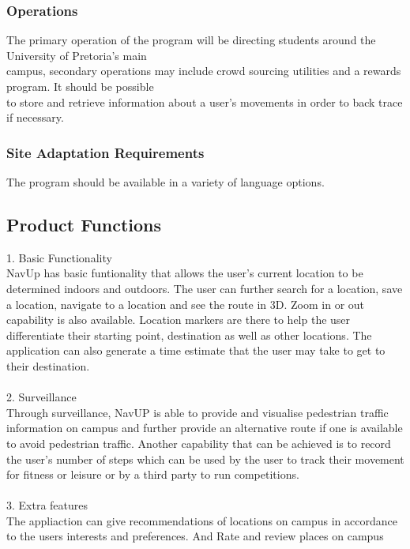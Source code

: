 \documentclass[a4paper,10pt]{article}
\begin{document}
		\subsubsection{Operations}
			The primary operation of the program will be directing students around the University of Pretoria’s main\\				campus, secondary operations may include crowd sourcing utilities and a rewards program. It should be possible\\			to store and retrieve information about a user’s movements in order to back trace if necessary.\\
		\subsubsection{Site Adaptation Requirements}
			The program should be available in a variety of language options.\\
		
		
	\subsection{Product Functions}
		1. Basic Functionality\\
			NavUp has basic funtionality that allows the user's current location to be determined indoors and outdoors. The user can further search for a location, save a location, navigate to a location and see the route in 3D. Zoom in or out capability is also available. Location markers  are there to help the user differentiate their starting point, destination as well as other locations. The application can also generate a time estimate that the user may take to get to their destination.\\
		\\
		2. Surveillance\\
			Through surveillance, NavUP is able to provide and visualise pedestrian traffic information on campus and further provide an alternative route if one is available to avoid pedestrian traffic. Another capability that can be achieved is to record the user's number of steps which can be used by the user to track their movement for fitness or leisure or by a third party to run competitions.\\
		\\
		3. Extra features\\
			The appliaction can give recommendations of locations on campus in accordance to the users interests and preferences. And Rate and review places on campus\\
			
\end{document}
